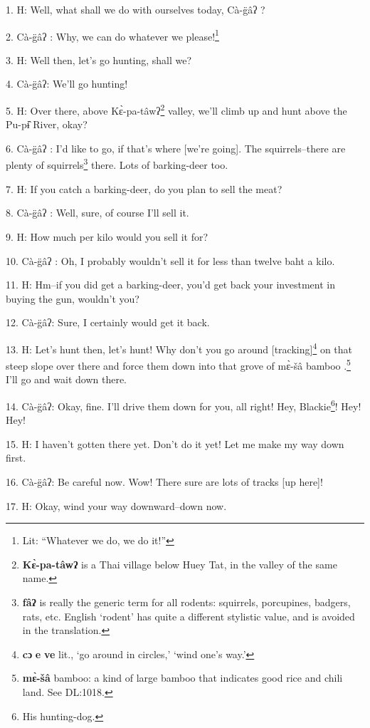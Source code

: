 \setcounter{footnote}{0}


1. H: Well, what shall we do with ourselves today, Cà-g̈âʔ ?

2. Cà-g̈âʔ : Why, we can do whatever we please!\footnote{Lit: ``Whatever we do, we do it!''}

3. H: Well then, let's go hunting, shall we?

4. Cà-g̈âʔ: We'll go hunting!

5. H: Over there, above Kɛ̀-pa-tâwʔ\footnote{\textbf{Kɛ̀-pa-tâwʔ} is a Thai village below Huey Tat, in the valley of the same name.} valley, we'll climb up and hunt above
the Pu-pɨ̂ River, okay?

6. Cà-g̈âʔ : I'd like to go, if that's where [we're going]. The squirrels--there
are plenty of squirrels\footnote{\textbf{fâʔ} is really the generic term for all rodents: squirrels, porcupines, badgers, rats, etc. English `rodent' has quite a different stylistic value, and is avoided in the translation.} there. Lots of barking-deer too.

7. H: If you catch a barking-deer, do you plan to sell the meat?

8. Cà-g̈âʔ : Well, sure, of course I'll sell it.

9. H: How much per kilo would you sell it for?

10. Cà-g̈âʔ : Oh, I probably wouldn't sell it for less than twelve baht a kilo.

11. H: Hm--if you did get a barking-deer, you'd get back your investment in buying
the gun, wouldn't you?

12. Cà-g̈âʔ: Sure, I certainly would get it back.

13. H: Let's hunt then, let's hunt! Why don't you go around [tracking]\footnote{\textbf{cɔ} \textbf{e} \textbf{ve} lit., `go around in circles,' `wind one's way.'} on that
steep slope over there and force them down into that grove of mɛ̀-šâ bamboo
.\footnote{\textbf{mɛ̀-šâ} bamboo: a kind of large bamboo that indicates good rice and chili land. See DL:1018.} I'll go and wait down there.

14. Cà-g̈âʔ: Okay, fine. I'll drive them down for you, all right! Hey, Blackie\footnote{His hunting-dog.}!
Hey! Hey!

15. H: I haven't gotten there yet. Don't do it yet! Let me make my way down first.

16. Cà-g̈âʔ: Be careful now. Wow! There sure are lots of tracks [up here]!

17. H: Okay, wind your way downward--down now.

